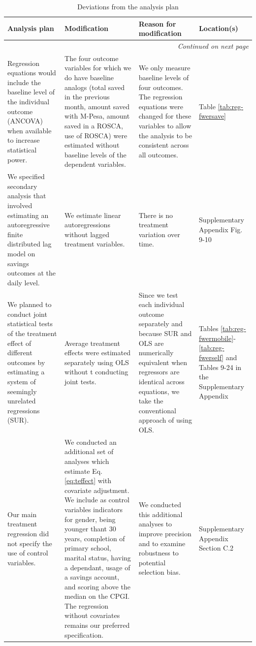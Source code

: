 \documentclass[11pt]{article}
\begin{document}
	\begin{landscape}
	
		\begin{longtable}{p{}p{}p{}p{}}
			\caption{Deviations from the analysis plan} \label{tab:deviations} \\
			\toprule
			Analysis plan & Modification & Reason for modification & Location(s) \\
			\midrule
			\endhead
			\hline \multicolumn{4}{r}{\textit{Continued on next page}} \\
			\endfoot
			\bottomrule
			\endlastfoot
			Regression equations would include the baseline level of the individual outcome (ANCOVA) when available to increase statistical power. & The four outcome variables for which we do have baseline analogs (total saved in the previous month, amount saved with M-Pesa, amount saved in a ROSCA, use of ROSCA) were estimated without baseline levels of the dependent variables. & We only measure baseline levels of four outcomes. The regression equations were changed for these variables to allow the analysis to be consistent across all outcomes. & Table \ref{tab:reg-fwersave} \\
			\midrule
			We specified secondary analysis that involved estimating an autoregressive finite distributed lag model on savings outcomes at the daily level. & We estimate linear autoregressions without lagged treatment variables. & There is no treatment variation over time. & Supplementary Appendix Fig. 9-10 \\
			\midrule
			We planned to conduct joint statistical tests of the treatment effect of different outcomes by estimating a system of seemingly unrelated regressions (SUR). & Average treatment effects were estimated separately using OLS without t conducting joint tests. & Since we test each individual outcome separately and because SUR and OLS are numerically equivalent when regressors are identical across equations, we take the conventional approach of using OLS. & Tables \ref{tab:reg-fwermobile}-\ref{tab:reg-fwerself} and Tables 9-24 in the Supplementary Appendix \\
			\midrule
			Our main treatment regression did not specify the use of control variables. & We conducted an additional set of analyses which estimate Eq. \ref{eq:teffect} with covariate adjustment. We include as control variables indicators for gender, being younger thant 30 years, completion of primary school, marital status, having a dependant, usage of a savings account, and scoring above the median on the CPGI. The regression without covariates remains our preferred specification. & We conducted this additional analyses to improve precision and to examine robustness to potential selection bias. & Supplementary Appendix Section C.2 \\

\end{longtable}
\end{landscape}
\end{document}
